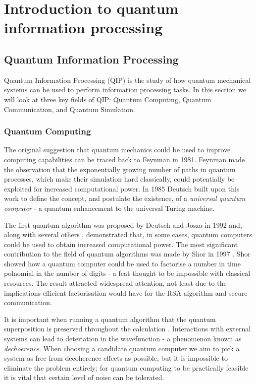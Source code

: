 \chapter{Introduction to quantum information processing} 
\label{ch:Introduction}

\section{Quantum Information Processing}

Quantum Information Processing (QIP) is the study of how quantum mechanical systems can be used to perform information processing tasks. In this section we will look at three key fields of QIP: Quantum Computing, Quantum Communication, and Quantum Simulation.

\subsection{Quantum Computing}

The original suggestion that quantum mechanics could be used to improve computing capabilities can be traced back to Feynman \cite{feynman_82} in 1981. Feynman made the observation that the exponentially growing number of paths in quantum processes, which make their simulation hard classically, could potentially be exploited for increased computational power. In 1985 Deutsch built upon this work to define the concept, and postulate the existence, of a \textit{universal quantum computer} \cite{deutsch_85} - a quantum enhancement to the universal Turing machine. 

The first quantum algorithm was proposed by Deutsch and Josza \cite{deutsch_jozsa_92} in 1992 and, along with several others \cite{simon_94, grovers_search}, demonstrated that, in some cases, quantum computers could be used to obtain increased computational power. The most significant contribution to the field of quantum algorithms was made by Shor in 1997 \cite{shors_algorithm}. Shor showed how a quantum computer could be used to factorise a number in time polnomial in the number of digits - a feat thought to be impossible with classical resources. The result attracted widespread attention, not least due to the implications efficient factorisation would have for the RSA algorithm \cite{rsa} and secure communication.

It is important when running a quantum algorithm that the quantum superposition is preserved throughout the calculation \cite{nature_cq_review_10}. Interactions with external systems can lead to deteriation in the wavefunction - a phenomenon known as \textit{dechoerence}. When choosing a candidate quantum computer we aim to pick a system as free from decoherence effects as possible, but it is impossible to eliminate the problem entirely; for quantum computing to be practically feasible it is vital that certain level of noise can be tolerated. 

